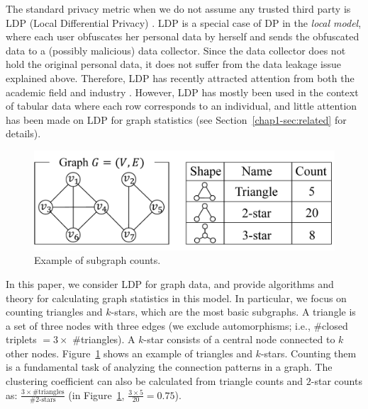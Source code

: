 The standard privacy metric when we do not assume any trusted third party is LDP (Local Differential Privacy) \cite{Duchi_FOCS13,Kasiviswanathan_FOCS08}. 
LDP is a special case of DP in the \textit{local model}, where each user obfuscates her personal data by herself and sends the obfuscated data to a (possibly malicious) data collector. 
Since the data collector does not hold the original personal data, it does not suffer from the data leakage issue explained above. 
Therefore, LDP has recently attracted attention from both the academic field \cite{Acharya_AISTATS19,Bassily_STOC15,Bassily_NIPS17,Fanti_PoPETs16,Kairouz_ICML16,Kairouz_JMLR16,Murakami_USENIX19,Qin_CCS16,Wang_USENIX17,Ye_ISIT17} and industry \cite{Erlingsson_CCS14,Ding_NIPS17,Thakurta_USPatent17}. 
However, LDP has mostly been used in the context of tabular data where each row corresponds to an individual, and little attention has been made on LDP for graph statistics (see 
Section~\ref{chap1-sec:related} for details). 

\begin{figure}
\centering
\includegraphics[width=0.9\linewidth]{fig/subgraph.pdf}
\vspace{-2mm}
\caption{Example of subgraph counts.}
\label{chap1-fig:subgraph}
\end{figure}

In this paper, we consider LDP for graph data, and 
provide algorithms and theory 
for calculating graph statistics in this model. 
In particular, we focus on counting triangles and $k$-stars, which are the most basic subgraphs. 
A triangle is a set of three nodes with three edges (we exclude automorphisms; i.e., \#closed triplets $= 3 \times$ \#triangles). 
A $k$-star consists of a central node connected to $k$ other nodes. 
Figure~\ref{chap1-fig:subgraph} shows an example of triangles and $k$-stars. 
Counting them is a fundamental task of analyzing the connection patterns in a graph. 
The clustering coefficient can also be calculated from triangle counts and $2$-star counts as: $\frac{3 \times \text{\#triangles}}{\#2\text{-stars}}$ (in Figure~\ref{chap1-fig:subgraph}, $\frac{3 \times 5}{20} = 0.75$). 

